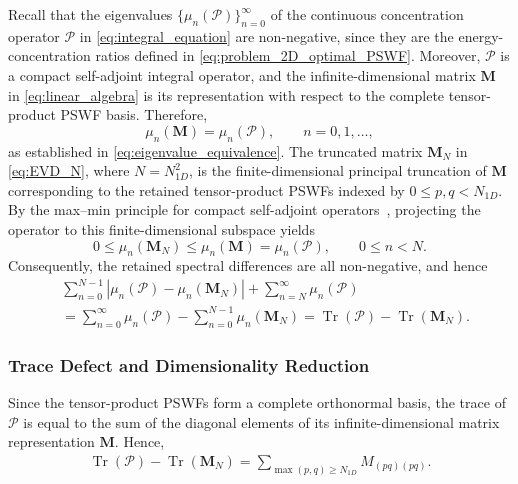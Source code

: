 \documentclass[lettersize,journal]{IEEEtran}
\theoremstyle{plain}
\begin{document}
Recall that the eigenvalues $\{\mu_n(\mathcal{P})\}_{n=0}^{\infty}$
of the continuous concentration operator $\mathcal{P}$ in
\eqref{eq:integral_equation} are non-negative, since they are the
energy-concentration ratios defined in \eqref{eq:problem_2D_optimal_PSWF}.
Moreover, $\mathcal{P}$ is a compact self-adjoint integral operator,
and the infinite-dimensional matrix $\mathbf{M}$ in
\eqref{eq:linear_algebra} is its representation with respect to the
complete tensor-product PSWF basis. Therefore,
$$
	\mu_n(\mathbf{M})
	=
	\mu_n(\mathcal{P}),
	\qquad n=0,1,\ldots,
$$
as established in \eqref{eq:eigenvalue_equivalence}.
The truncated matrix $\mathbf{M}_N$ in \eqref{eq:EVD_N},
where $N=N_{1D}^2$, is the finite-dimensional principal truncation of
$\mathbf{M}$ corresponding to the retained tensor-product PSWFs indexed
by $0\leq p,q<N_{1D}$. 
By the max--min principle for compact self-adjoint operators~\cite[Theorem~4.22]{Borthwick2020Spectral}, projecting the operator to this finite-dimensional subspace yields
\begin{equation}
	0
	\leq
	\mu_n(\mathbf{M}_N)
	\leq
	\mu_n(\mathbf{M})
	=
	\mu_n(\mathcal{P}),
	\qquad 0\leq n<N.
	\label{eq:Ritz_ordering}
\end{equation}
Consequently, the retained spectral differences are all
non-negative, and hence
\begin{align}
	&\sum_{n=0}^{N-1}
	\left|
	\mu_n(\mathcal{P})-\mu_n(\mathbf{M}_N)
	\right|
	+
	\sum_{n=N}^{\infty}\mu_n(\mathcal{P})
	\nonumber\\
	&=
	\sum_{n=0}^{\infty}\mu_n(\mathcal{P})
	-
	\sum_{n=0}^{N-1}\mu_n(\mathbf{M}_N) =
	\operatorname{Tr}(\mathcal{P})
	-
	\operatorname{Tr}(\mathbf{M}_N).
	\label{eq:trace_defect_identity}
\end{align}

\subsubsection{Trace Defect and Dimensionality Reduction}
Since the tensor-product PSWFs form a complete orthonormal
basis, the trace of $\mathcal{P}$ is equal to the sum of the
diagonal elements of its infinite-dimensional matrix
representation $\mathbf{M}$. Hence,
\begin{align}
	\operatorname{Tr}(\mathcal{P})
	-
	\operatorname{Tr}(\mathbf{M}_N) =
	\sum_{\max(p,q)\geq N_{1D}}
	M_{(pq)(pq)}.
	\label{eq:trace_defect_diagonal}
\end{align}
\end{document}

